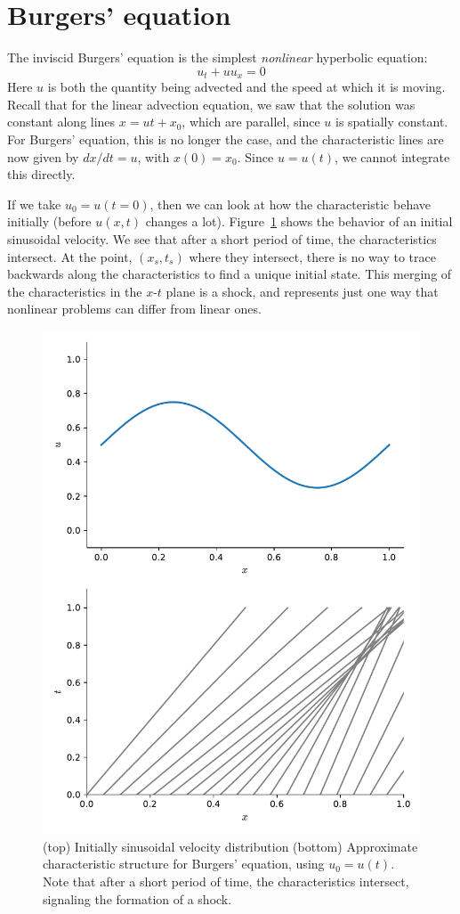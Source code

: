 

\section{Burgers' equation}

The inviscid Burgers' equation is the simplest {\em nonlinear} hyperbolic
equation:
\begin{equation}
u_t + u u_x = 0
\end{equation}
Here $u$ is both the quantity being advected and the speed at which 
it is moving.  Recall that for the linear advection equation, we saw
that the solution was constant along lines $x = ut + x_0$, which are
parallel, since $u$ is spatially constant.  For Burgers' equation, 
this is no longer the case, and the characteristic lines are now
given by $dx/dt = u$, with $x(0) = x_0$.  Since $u = u(t)$, we cannot
integrate this directly.   

If we take $u_0 = u(t=0)$, then we can look at how the characteristic
behave initially (before $u(x,t)$ changes a lot).
Figure~\ref{fig:burgers_char} shows the behavior of an initial
sinusoidal velocity.  We see that after a short period of time, the
characteristics intersect.  At the point, $(x_s, t_s)$ where they 
intersect, there is no way to trace backwards along the characteristics to
find a unique initial state.  This merging of the characteristics in 
the $x$-$t$ plane is a shock, and represents just one way that nonlinear
problems can differ from linear ones.

\begin{figure}[t]
\centering
\includegraphics[width=0.6\linewidth]{burgers-characteristics}
\caption[Characteristics for shock initial conditions]
{\label{fig:burgers_char} (top) Initially sinusoidal
velocity distribution (bottom) Approximate characteristic
structure for Burgers' equation, using $u_0 = u(t)$.  Note that
after a short period of time, the characteristics intersect, signaling
the formation of a shock.}
\end{figure}



